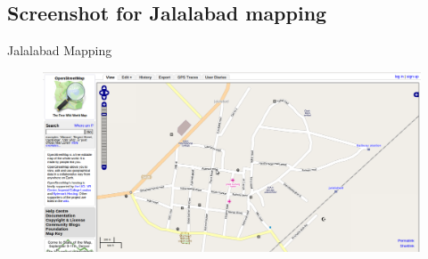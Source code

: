 \subsection{Screenshot for Jalalabad mapping}
\begin{frame}{Jalalabad Mapping}
\begin{figure}
\label{imag}
\centering
\includegraphics[scale=0.2]{ss1.png}
\end{figure}
\end{frame}



 
